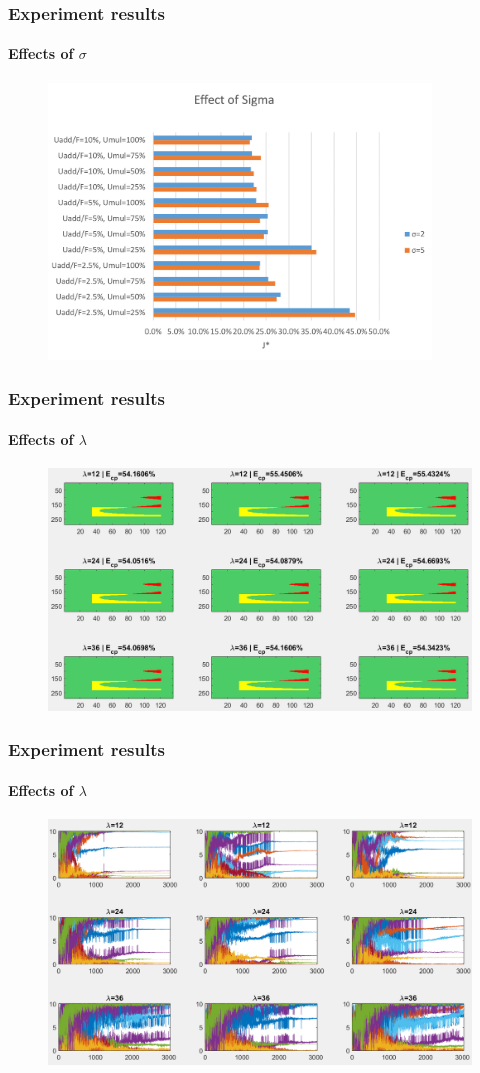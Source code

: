 \documentclass[fleqn]{beamer}
\begin{document}
\begin{frame}
	\frametitle{Experiment results}
	\framesubtitle{Effects of $\sigma$}
	\begin{figure}
		\centering
		\includegraphics[width=4in]{figures/sigma.png}
	\end{figure}
\end{frame}


\begin{frame}
	\frametitle{Experiment results}
	\framesubtitle{Effects of $\lambda$}
	\begin{figure}
		\centering
		\includegraphics[width=4.5in]{figures/results_figures/lambda/cp_lambda_all.png}
	\end{figure}
\end{frame}

\begin{frame}
	\frametitle{Experiment results}
	\framesubtitle{Effects of $\lambda$}
	\begin{figure}
		\centering
		\includegraphics[width=4.5in]{figures/results_figures/lambda/knobs_lambda_all.png}
	\end{figure}
\end{frame}
\end{document}
